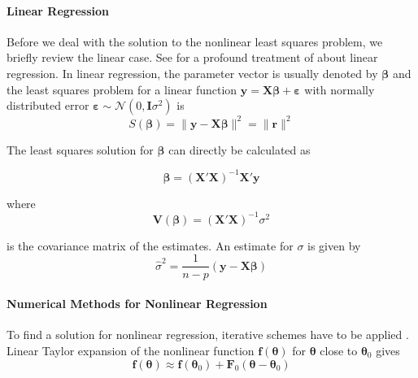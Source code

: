 \paragraph{Linear Regression\\}
Before we deal with the solution to the nonlinear least squares problem, we briefly review the linear case. See \citet{Draper} for a profound treatment of about linear regression.
In linear regression, the parameter vector is usually denoted by $\boldsymbol{\beta}$ and the least squares problem for a linear function 
$\mathbf{y} = \mathbf{X} \boldsymbol{\beta} + \boldsymbol{\varepsilon}$ 
with normally distributed error 
$\boldsymbol{\varepsilon} \sim \mathcal{N}(0,\mathbf{I} \sigma^2)$ 
is
\begin{equation}
S(\boldsymbol{\beta}) = \| \mathbf{y} - \mathbf{X}\boldsymbol{\beta} \|^2 = \| \mathbf{r} \|^2
\end{equation}

The least squares solution for $\boldsymbol{\beta}$ can directly be calculated as

\begin{equation}
\label{eq:linear_ls_solution}
\boldsymbol{\beta} = (\mathbf{X}' \mathbf{X})^{-1} \mathbf{X}' \mathbf{y}
\end{equation}

where
\begin{equation}
\label{eq:linear_ls_covariance}
\mathbf{V} (\boldsymbol{\beta}) = (\mathbf{X}' \mathbf{X})^{-1} {\sigma}^2
\end{equation}

is the covariance matrix of the estimates. An estimate for ${\sigma}$ is given by
\begin{equation}
\hat{\sigma}^2 = \frac{1}{n-p} (\mathbf{y} - \mathbf{X} \boldsymbol{\beta})
\end{equation}

\paragraph{Numerical Methods for Nonlinear Regression\\}
To find a solution for nonlinear regression, iterative schemes have to be applied \citep{Seber}.
Linear Taylor expansion of the nonlinear function
$\mathbf{f}(\boldsymbol{\theta})$ 
for 
$\boldsymbol{\theta}$
close to 
$\boldsymbol{\theta}_0$
gives
\begin{equation}
\label{eq:linearized_f}
\mathbf{f}(\boldsymbol{\theta}) \approx
\mathbf{f}(\boldsymbol{\theta}_0) + \mathbf{F}_0(\boldsymbol{\theta} - \boldsymbol{\theta}_0)
\end{equation}

